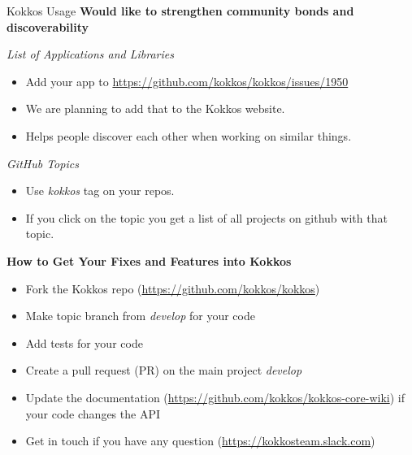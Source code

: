 \begin{frame}[fragile]{Kokkos Usage}
  \textbf{Would like to strengthen community bonds and discoverability}

  \vspace{10pt}
  \textit{List of Applications and Libraries}
  \begin{itemize}
    \item Add your app to \url{https://github.com/kokkos/kokkos/issues/1950}
    \item We are planning to add that to the Kokkos website.
    \item Helps people discover each other when working on similar things.
  \end{itemize}

  \vspace{10pt}
  \textit{GitHub Topics}
  \begin{itemize}
    \item Use \textit{kokkos} tag on your repos.
    \item If you click on the topic you get a list of all projects on github with that topic.
  \end{itemize}
\end{frame}











\begin{frame}[fragile]

  \vspace{10pt}

  \textbf{How to Get Your Fixes and Features into Kokkos}
  \newline
  \begin{itemize}
    \item Fork the Kokkos repo (\url{https://github.com/kokkos/kokkos})
    \item Make topic branch from \textit{develop} for your code
    \item Add tests for your code
    \item Create a pull request (PR) on the main project \textit{develop}
    \item Update the documentation (\url{https://github.com/kokkos/kokkos-core-wiki}) if your code changes the API
    \item Get in touch if you have any question (\url{https://kokkosteam.slack.com})
  \end{itemize}

\end{frame}



